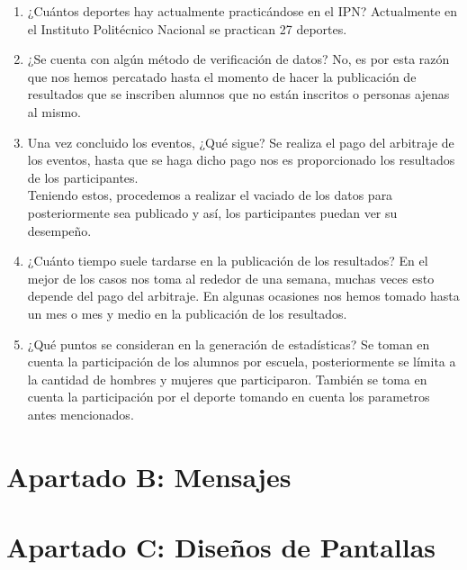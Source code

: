\begin{enumerate}
		\item ¿Cuántos deportes hay actualmente practicándose en el IPN?
		Actualmente en el Instituto Politécnico Nacional se practican 27 deportes.
		
		\item ¿Se cuenta con algún método de verificación de datos?
		No, es por esta razón que nos hemos percatado hasta el momento de hacer la publicación de resultados que se inscriben alumnos que no están inscritos o personas ajenas al mismo.
		
		\item Una vez concluido los eventos, ¿Qué sigue?
		Se realiza el pago del arbitraje de los eventos, hasta que se haga dicho pago nos es proporcionado los resultados de los participantes.\\
		Teniendo estos, procedemos a realizar el vaciado de los datos para posteriormente sea publicado y así, los participantes puedan ver su desempeño.
		
		\item ¿Cuánto tiempo suele tardarse en la publicación de los resultados?
		En el mejor de los casos nos toma al rededor de una semana, muchas veces esto depende del pago del arbitraje. En algunas ocasiones nos hemos tomado hasta un mes o mes y medio en la publicación de los resultados. 
		
		\item ¿Qué puntos se consideran en la generación de estadísticas?
		Se toman en cuenta la participación de los alumnos por escuela, posteriormente se límita a la cantidad de hombres y mujeres que participaron. También se toma en cuenta la participación por el deporte tomando en cuenta los parametros antes mencionados.
		
	\end{enumerate} 
	
	\chapter{Apartado B: Mensajes}
	
		\pagebreak
		
	\chapter{Apartado C: Diseños de Pantallas}
	
